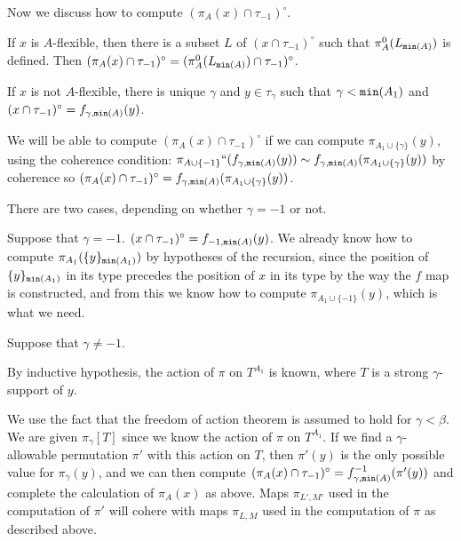 \documentclass[112pt]{article}
\begin{document}
\begin{description}
Now we discuss how to compute $(\pi_A(x)\cap \tau_{-1})^{\circ}$.

If $x$ is $A$-flexible, then there is a subset $L$ of $(x \cap \tau_{-1})^\circ$ such that $\pi^0_A(L_{{\tt min}(A)})$ is defined.  Then $(\pi_A(x) \cap \tau_{-1})^\circ = (\pi^0_A(L_{{\tt min}(A)})\cap \tau_{-1})^\circ$.

If $x$ is not $A$-flexible, there is unique $\gamma$ and $y \in \tau_\gamma$ such that $\gamma < {\tt min}(A_1)$ and $(x \cap \tau_{-1})^\circ = f_{\gamma,{\tt min}(A)}(y)$.

We will be able to compute $(\pi_A(x) \cap \tau_{-1})^\circ$ if we can compute $\pi_{A_1 \cup \{\gamma\}}(y)$, using the coherence condition:
$\pi_{A\cup \{-1\}}``(f_{\gamma,{\tt min}(A)}(y)) \sim f_{\gamma,{\tt min}(A)}(\pi_{A_1 \cup \{\gamma\}}(y))$ by coherence so $(\pi_A(x)\cap \tau_{-1})^{\circ} = f_{\gamma,{\tt min}(A)}(\pi_{A_1 \cup \{\gamma\}}(y))$.

There are two cases, depending on whether $\gamma=-1$ or not.

Suppose that $\gamma=-1$.   $(x \cap \tau_{-1})^\circ = f_{-1,{\tt min}(A)}(y)$.  We already know how to compute
$\pi_{A_1}(\{y\}_{{\tt min}(A_1)})$ by hypotheses of the recursion, since the position of $\{y\}_{{\tt min}(A_1)}$ in its type precedes the position of $x$ in its type by the way the $f$ map is constructed, and from this we know how to compute $\pi_{A_1 \cup \{-1\}}(y)$, which is what we need.

Suppose that $\gamma\neq -1$.



By inductive hypothesis, the action of $\pi$ on $T^{A_1}$ is known, where $T$ is a strong $\gamma$-support of $y$.

We use the fact that the freedom of action theorem is assumed to hold for $\gamma<\beta$.  We are given $\pi_\gamma[T]$ since we know the action
of $\pi$ on $T^{A_1}$.  If we find a $\gamma$-allowable permutation $\pi'$ with this action on $T$, then $\pi'(y)$ is the only possible value for
$\pi_\gamma(y)$, and we can then compute $(\pi_A(x)\cap \tau_{-1})^\circ=f_{\gamma,{\tt min}(A)}^{-1}(\pi'(y))$ and complete the calculation of $\pi_A(x)$ as above.  Maps $\pi_{L',M'}$ used in the computation of $\pi'$ will cohere with maps $\pi_{L,M}$ used in the computation of $\pi$ as described above.


\end{description}
\end{document}
